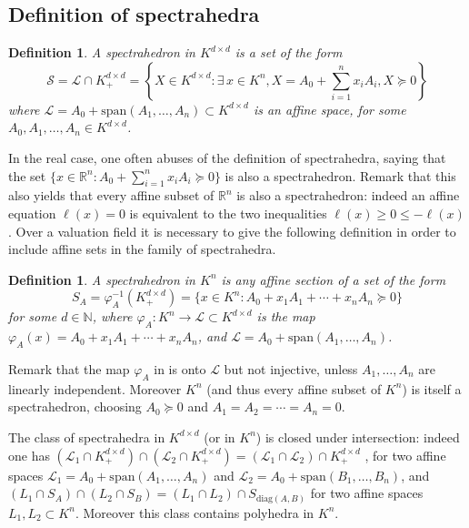 \documentclass[a4paper,12pt]{article}
\newtheorem{definition}[theorem]{Definition}
\renewcommand{\span}[1]{{\text{span}(#1)}} %
\def\diag{\mathrm{diag}}
\begin{document}
\subsection{Definition of spectrahedra}

\begin{definition}
  \label{def_spectrahedra}
  A \emph{spectrahedron in $K^{d\times d}$} is a set of the form
  $$
  \mathcal{S} = \mathcal{L} \cap K^{d\times d}_+ = \left\{X \in K^{d \times d} :
  \exists \, x \in K^n, X = A_0 + \sum_{i=1}^n x_i A_i, X \succeq 0\right\}
  $$
  where $\mathcal{L} = A_0+\span{A_1,\ldots,A_n} \subset K^{d \times d}$ is an affine space, for some
  $A_0,A_1,\ldots,A_n \in K^{d\times d}$.
\end{definition}

In the real case, one often abuses of the definition of spectrahedra, saying that the set
$\{x \in \mathbb{R}^n : A_0+\sum_{i=1}^n x_iA_i \succeq 0\}$ is also a spectrahedron.
Remark that this also yields that every affine subset of $\mathbb{R}^n$ is also
a spectrahedron: indeed an affine equation $\ell(x) = 0$ is equivalent to the two inequalities
$\ell(x) \geq 0 \leq -\ell(x)$. Over a valuation field it is necessary to give the following
definition in order to include affine sets in the family of spectrahedra.

\begin{definition}
  \label{def_spectrahedra_Kn}
  A \emph{spectrahedron in $K^n$} is any affine section of a set of the form
  $$
  S_A = \varphi_A^{-1}(K^{d \times d}_+) = \{x \in K^n : A_0+x_1A_1+\cdots+x_nA_n \succeq 0\}
  $$
  for some $d\in \mathbb{N}$,
  where $\varphi_A : K^n \to \mathcal{L} \subset K^{d \times d}$ is the map
  $\varphi_A(x) = A_0+x_1A_1+\cdots+x_nA_n$, and $\mathcal{L} = A_0+\span{A_1,\ldots,A_n}$.
\end{definition}

Remark that the map $\varphi_A$ in  is onto $\mathcal{L}$ but not
injective, unless $A_1,\ldots,A_n$ are linearly independent. Moreover $K^n$ (and thus every affine
subset of $K^n$) is itself a spectrahedron, choosing $A_0 \succeq 0$ and $A_1=A_2=\cdots=A_n=0$.

The class of spectrahedra in $K^{d \times d}$ (or in $K^n$) is closed under intersection: indeed one
has $(\mathcal{L}_1 \cap K^{d \times d}_+) \cap (\mathcal{L}_2 \cap K^{d \times d}_+) =
(\mathcal{L}_1 \cap \mathcal{L}_2) \cap K^{d \times d}_+$
, for two affine spaces
$\mathcal{L}_1 = A_0+\span{A_1,\ldots,A_n}$ and $\mathcal{L}_2 = A_0+\span{B_1,\ldots,B_n}$,
and
$(L_1 \cap S_A) \cap (L_2 \cap S_B) = (L_1\cap L_2) \cap S_{\diag(A,B)}$ for
two affine spaces $L_1,L_2 \subset K^n$.
Moreover this class contains polyhedra in $K^n$.
\end{document}
